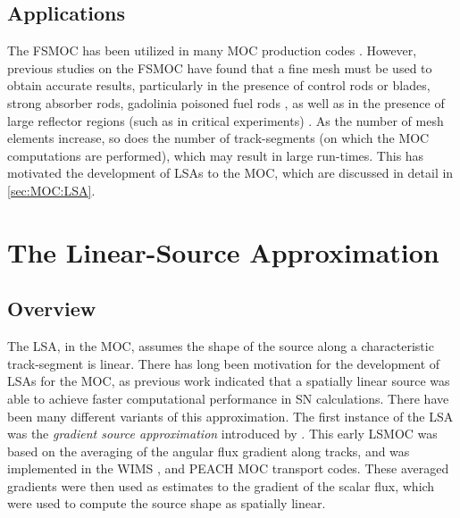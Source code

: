 {{        \subsection{Applications}{\label{ssec:FSA:Applications}
            The \ac{FSMOC} has been utilized in many \ac{MOC} production codes \cite{Halsall1980,Hong1998,Saji2000,Smith2002,Sugimura2006,Masiello2008,Boyd2014,Collins2016}.
            However, previous studies on the \ac{FSMOC} have found that a fine mesh must be used to obtain accurate results, particularly in the presence of control rods or blades, strong absorber rods, gadolinia poisoned fuel rods \cite{Petkov1999}, as well as in the presence of large reflector regions (such as in critical experiments) \cite{Ferrer2016}.
            As the number of mesh elements increase, so does the number of track-segments (on which the \ac{MOC} computations are performed), which may result in large run-times.
            This has motivated the development of \acfp{LSA} to the \ac{MOC}, which are discussed in detail in \cref{sec:MOC:LSA}.
        }
    }
    \section{The Linear-Source Approximation}{\label{sec:MOC:LSA}
        \subsection{Overview}{\label{ssec:MOC:LSA:Overview}
            The \acf{LSA}, in the \ac{MOC}, assumes the shape of the source along a characteristic track-segment is linear.
            There has long been motivation for the development of \acp{LSA} for the \ac{MOC}, as previous work \cite{Larsen1980} indicated that a spatially linear source was able to achieve faster computational performance in \ac{SN} calculations.
            There have been many different variants of this approximation.
            The first instance of the \ac{LSA} was the \emph{gradient source approximation} introduced by \citet{Halsall1993}.
            This early \ac{LSMOC} was based on the averaging of the angular flux gradient along tracks, and was implemented in the WIMS \cite{Halsall1993}, and PEACH \cite{Tang2009} \ac{MOC} transport codes.
            These averaged gradients were then used as estimates to the gradient of the scalar flux, which were used to compute the source shape as spatially linear.

}}}
